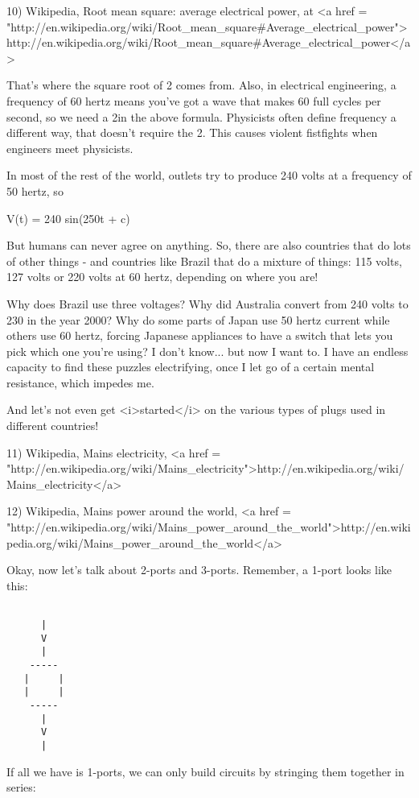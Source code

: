 10) Wikipedia, Root mean square: average electrical power, at
<a href = "http://en.wikipedia.org/wiki/Root_mean_square#Average_electrical_power">http://en.wikipedia.org/wiki/Root_mean_square#Average_electrical_power</a>

That's where the square root of 2 comes from.  Also, in electrical
engineering, a frequency of 60 hertz means you've got a wave that
makes 60 full cycles per second, so we need a 2\pi  in the above
formula.  Physicists often define frequency a different way, that
doesn't require the 2\pi .  This causes violent fistfights when
engineers meet physicists.

In most of the rest of the world, outlets try to produce 240 volts 
at a frequency of 50 hertz, so

V(t) =  240 sin(2\pi  50t + c)

But humans can never agree on anything.  So, there are also countries
that do lots of other things - and countries like Brazil that do a
mixture of things: 115 volts, 127 volts or 220 volts at 60 hertz,
depending on where you are!  

Why does Brazil use three voltages?  Why did Australia convert from 
240 volts to 230 in the year 2000?  Why do some parts of Japan use 50 
hertz current while others use 60 hertz, forcing Japanese appliances 
to have a switch that lets you pick which one you're using?  I don't 
know... but now I want to.  I have an endless capacity to find these
puzzles electrifying, once I let go of a certain mental resistance, 
which impedes me.

And let's not even get <i>started</i> on the various types of plugs used 
in different countries!

11) Wikipedia, Mains electricity, 
<a href = "http://en.wikipedia.org/wiki/Mains_electricity">http://en.wikipedia.org/wiki/Mains_electricity</a>

12) Wikipedia, Mains power around the world,
<a href = "http://en.wikipedia.org/wiki/Mains_power_around_the_world">http://en.wikipedia.org/wiki/Mains_power_around_the_world</a>
 
Okay, now let's talk about 2-ports and 3-ports.  Remember, a 1-port
looks like this:


\begin{verbatim}

      |
      V
      |
    -----
   |     |
   |     |
    -----
      |
      V
      |
\end{verbatim}
    
If all we have is 1-ports, we can only build circuits by stringing
them together in series:


